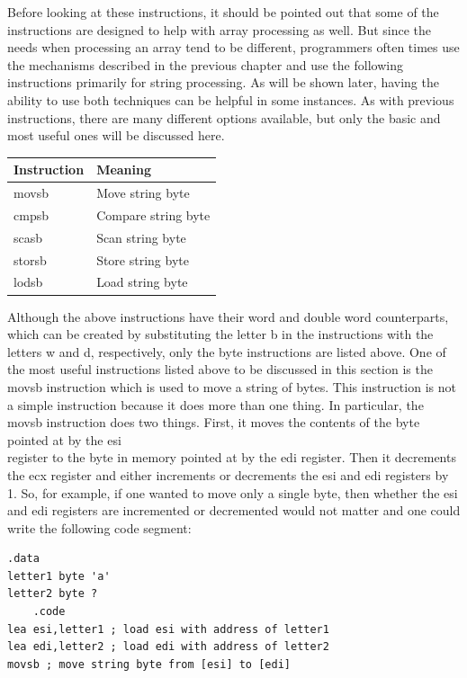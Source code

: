 \documentclass[10pt]{book}
\begin{document}
Before looking at these instructions, it should be pointed out that some of the instructions are designed to help with array processing as well. But since the needs when processing an array tend to be different, programmers often times use the mechanisms described in the previous chapter and use the following instructions primarily for string processing. As will be shown later, having the ability to use both techniques can be helpful in some instances. As with previous instructions, there are many different options available, but only the basic and most useful ones will be discussed here.

\begin{center}
\begin{tabular}{|l|l|}
\hline
Instruction & Meaning \\
\hline
movsb & Move string byte \\
\hline
cmpsb & Compare string byte \\
\hline
scasb & Scan string byte \\
\hline
storsb & Store string byte \\
\hline
lodsb & Load string byte \\
\hline
\end{tabular}
\end{center}

Although the above instructions have their word and double word counterparts, which can be created by substituting the letter b in the instructions with the letters w and d, respectively, only the byte instructions are listed above. One of the most useful instructions listed above to be discussed in this section is the movsb instruction which is used to move a string of bytes. This instruction is not a simple instruction because it does more than one thing. In particular, the movsb instruction does two things. First, it moves the contents of the byte pointed at by the esi\\
register to the byte in memory pointed at by the edi register. Then it decrements the ecx register and either increments or decrements the esi and edi registers by 1. So, for example, if one wanted to move only a single byte, then whether the esi and edi registers are incremented or decremented would not matter and one could write the following code segment:


\begin{verbatim}
.data
letter1 byte 'a'
letter2 byte ?
    .code
lea esi,letter1 ; load esi with address of letter1
lea edi,letter2 ; load edi with address of letter2
movsb ; move string byte from [esi] to [edi]
\end{verbatim}
\end{document}
